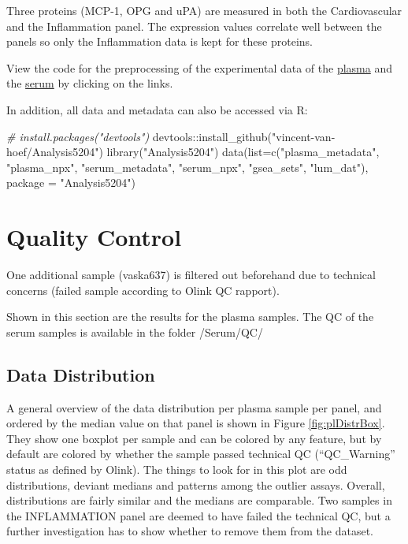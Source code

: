 \documentclass[
]{book}
\newenvironment{Shaded}{\begin{snugshade}}{\end{snugshade}}
\newcommand{\AttributeTok}[1]{\textcolor[rgb]{0.77,0.63,0.00}{#1}}
\newcommand{\CommentTok}[1]{\textcolor[rgb]{0.56,0.35,0.01}{\textit{#1}}}
\newcommand{\FunctionTok}[1]{\textcolor[rgb]{0.00,0.00,0.00}{#1}}
\newcommand{\NormalTok}[1]{#1}
\newcommand{\SpecialCharTok}[1]{\textcolor[rgb]{0.00,0.00,0.00}{#1}}
\newcommand{\StringTok}[1]{\textcolor[rgb]{0.31,0.60,0.02}{#1}}
\begin{document}
Three proteins (MCP-1, OPG and uPA) are measured in both the Cardiovascular and
the Inflammation panel. The expression values correlate well between the panels
so only the Inflammation data is kept for these proteins.

View the code for the preprocessing of the experimental data of the
\href{https://raw.githubusercontent.com/vincent-van-hoef/Analysis5204/master/data-raw/plasma_npx.R}{plasma}
and the
\href{https://raw.githubusercontent.com/vincent-van-hoef/Analysis5204/master/data-raw/serum_npx.R}{serum}
by clicking on the links.

In addition, all data and metadata can also be accessed via R:

\begin{Shaded}
\begin{Highlighting}[]
\CommentTok{\# install.packages("devtools")}
\NormalTok{devtools}\SpecialCharTok{::}\FunctionTok{install\_github}\NormalTok{(}\StringTok{"vincent{-}van{-}hoef/Analysis5204"}\NormalTok{)}
\FunctionTok{library}\NormalTok{(}\StringTok{"Analysis5204"}\NormalTok{)}
\FunctionTok{data}\NormalTok{(}\AttributeTok{list=}\FunctionTok{c}\NormalTok{(}\StringTok{"plasma\_metadata"}\NormalTok{, }\StringTok{"plasma\_npx"}\NormalTok{, }\StringTok{"serum\_metadata"}\NormalTok{, }\StringTok{"serum\_npx"}\NormalTok{, }\StringTok{"gsea\_sets"}\NormalTok{, }\StringTok{"lum\_dat"}\NormalTok{),}
      \AttributeTok{package =} \StringTok{"Analysis5204"}\NormalTok{)}
\end{Highlighting}
\end{Shaded}

\hypertarget{quality-control}{%
\chapter{Quality Control}\label{quality-control}}

One additional sample (vaska637) is filtered out beforehand due to technical concerns (failed sample according to Olink QC rapport).

Shown in this section are the results for the plasma samples. The QC of the serum samples is available in the folder /Serum/QC/

\hypertarget{data-distribution}{%
\section{Data Distribution}\label{data-distribution}}

A general overview of the data distribution per plasma sample per panel, and
ordered by the median value on that panel is shown in Figure
\ref{fig:plDistrBox}. They show one boxplot per sample and can be colored by
any feature, but by default are colored by whether the sample passed technical
QC (``QC\_Warning'' status as defined by Olink). The things to look for in this
plot are odd distributions, deviant medians and patterns among the outlier
assays. Overall, distributions are fairly similar and the medians are
comparable. Two samples in the INFLAMMATION panel are deemed to have failed the
technical QC, but a further investigation has to show whether to remove them
from the dataset.
\end{document}
